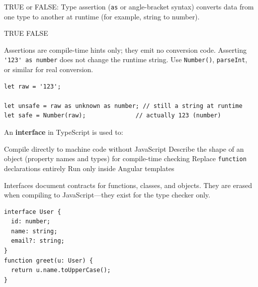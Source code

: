 \question[4]
TRUE or FALSE: Type assertion (\lstinline[style=tsinline]|as| or angle-bracket syntax) converts data from one type to another at runtime (for example, string to number).
\begin{choices}
  \choice TRUE
  \CorrectChoice FALSE
\end{choices}
\begin{solution}
  Assertions are compile-time hints only; they emit no conversion code. Asserting \lstinline[style=tsinline]|'123' as number| does not change the runtime string. Use \lstinline[style=tsinline]|Number()|, \lstinline[style=tsinline]|parseInt|, or similar for real conversion.
\begin{lstlisting}[style=ts]
let raw = '123';

let unsafe = raw as unknown as number; // still a string at runtime
let safe = Number(raw);              // actually 123 (number)
\end{lstlisting}
\end{solution}



\newpage




\question[4]
An \textbf{interface} in TypeScript is used to:
\begin{choices}
  \choice Compile directly to machine code without JavaScript
  \CorrectChoice Describe the shape of an object (property names and types) for compile-time checking
  \choice Replace \lstinline[style=tsinline]|function| declarations entirely
  \choice Run only inside Angular templates
\end{choices}
\begin{solution}
  Interfaces document contracts for functions, classes, and objects. They are erased when compiling to JavaScript---they exist for the type checker only.
\begin{lstlisting}[style=ts]
interface User {
  id: number;
  name: string;
  email?: string;
}
function greet(u: User) {
  return u.name.toUpperCase();
}
\end{lstlisting}
\end{solution}

